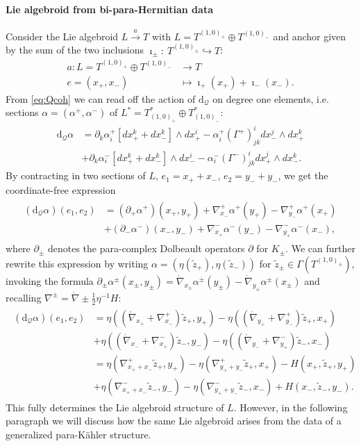 \documentclass{article}
\newcommand{\QQ}{\mathcal{Q}}
\newcommand{\lc}{\mathring{\n}}
\newcommand{\ap}{\alpha}
\def\w{\wedge}
\newcommand{\p}{\partial}
\newcommand{\n}{\nabla}
\newcommand{\rd}{\mathrm{d}}
\newcommand{\se}{\Gamma}
\newcommand{\zt}{\tl{z}}
\def\tl{\tilde}
\theoremstyle{definition}
\theoremstyle{remark}
\begin{document}
\paragraph{Lie algebroid from bi-para-Hermitian data} Consider the Lie algebroid $L\overset{a}{\rightarrow} T$ with $L=T^{(1,0)_+}\oplus T^{(1,0)_-}$ and anchor given by the sum of the two inclusions $\imath_\pm:\ T^{(1,0)_\pm}\hookrightarrow T$:
\begin{align*}
a:L=T^{(1,0)_+}\oplus T^{(1,0)_-} &\rightarrow T\\
 e=(x_+,x_-) &\mapsto \imath_+(x_+)+\imath_-(x_-).
\end{align*}
From \eqref{eq:Qcoh} we can read off the action of $\rd_\QQ$ on degree one elements, i.e. sections $\alpha=(\alpha^+,\alpha^-)$ of $L^*=T^*_{(1,0)_+}\oplus T^*_{(1,0)_-}$:
\begin{align*}
\rd_\QQ\alpha&=\p_k\ap_i^+[dx_+^k+dx_-^k]\w dx_+^i-\ap^+_i(\Gamma^+)^i_{jk}dx_-^j\w dx_+^k\\
&+\p_k\ap_i^-[dx_+^k+dx_-^k]\w dx_-^i-\ap^-_i(\Gamma^-)^i_{jk}dx_+^j\w dx_-^k.
\end{align*}
By contracting in two sections of $L$, $e_1=x_++x_-$, $e_2=y_-+y_-$, we get the coordinate-free expression
\begin{align}\label{eq:dQ}
\begin{aligned}
(\rd_\QQ\ap)(e_1,e_2)&=(\p_+\ap^+)(x_+,y_+)+\n^+_{x_-}\ap^+(y_+)-\n^+_{y_-}\ap^+(x_+)\\
&+(\p_-\ap^-)(x_-,y_-)+\n^-_{x_+}\ap^-(y_-)-\n^-_{y_+}\ap^-(x_-),
\end{aligned}
\end{align}
where $\p_\pm$ denotes the para-complex Dolbeault operators $\p$ for $K_\pm$. We can further rewrite this expression by writing $\ap=(\eta(\tl{z}_+),\eta(\tl{z}_-))$ for $\tl{z}_\pm \in \se(T^{(1,0)_\pm})$, invoking the formula $\p_\pm\ap^\pm(x_\pm,y_\pm)=\lc_{x_\pm}\ap^\pm(y_\pm)-\lc_{y_\pm}\ap^\pm(x_\pm)$ and recalling $\n^\pm=\lc\pm \frac{1}{2}\eta^{-1}H$:
\begin{align}
\begin{aligned}
(\rd_\QQ\ap)(e_1,e_2)&=\eta((\lc_{x_+}+\n_{x_-}^+)\zt_+,y_+)-\eta((\lc_{y_+}+\n_{y_-}^+)\zt_+,x_+)\\
&+\eta((\lc_{x_-}+\n_{x_+}^-)\zt_-,y_-)-\eta((\lc_{y_-}+\n_{y_+}^-)\zt_-,x_-)\\
&=\eta(\n^+_{x_++x_-}\zt_+,y_+)-\eta(\n_{y_++y_-}^+\zt_+,x_+)-H(x_+,\zt_+,y_+)\\
&+\eta(\n_{x_++x_-}^-\zt_-,y_-)-\eta(\n_{y_++y_-}^-\zt_-,x_-)+H(x_-,\zt_-,y_-).
\end{aligned}
\end{align}
This fully determines the Lie algebroid structure of $L$. However, in the following paragraph we will discuss how the same Lie algebroid arises from the data of a generalized para-K\"ahler structure.
\end{document}
